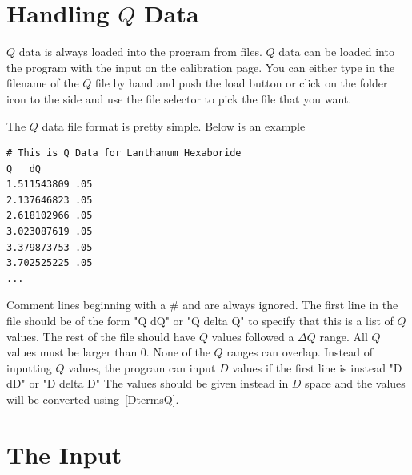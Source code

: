 \section{\texorpdfstring{Handling $Q$ Data}{Handling Q Data}}
\label{TheQValues}

$Q$ data is always loaded into the program from files. 
$Q$ data can be loaded into the program with the 
input on the calibration page. 
You can either type in the filename of the $Q$ file by hand 
and push the load button or click on the folder icon to the 
side and use the file selector to pick the file that you want.

The $Q$ data file format is pretty simple. Below is an example 
\begin{lstlisting}[caption={Lanthanum Hexaboride.dat},label=LaB6]
# This is Q Data for Lanthanum Hexaboride
Q   dQ
1.511543809 .05
2.137646823 .05
2.618102966 .05
3.023087619 .05
3.379873753 .05
3.702525225 .05
...
\end{lstlisting}
Comment lines beginning with a \# and are always ignored. The
first line in the file should be of the form "Q  dQ" or "Q  delta Q" 
to specify that this is a list of $Q$ values. The rest of the
file should have $Q$ values followed a $\Delta Q$ range.
All $Q$ values must be larger than 0. None of the $Q$ ranges can 
overlap. Instead of inputting $Q$ values, the program can input
$D$ values if the first line is instead "D dD" or "D delta D"
The values should be given instead in $D$ space and the values
will be converted using~\ref{DtermsQ}.

\section{\texorpdfstring{The  Input}{The Get From Header Input}}

